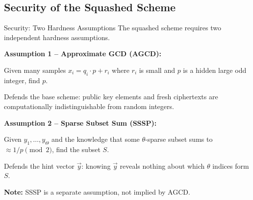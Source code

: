 \documentclass[10pt]{beamer}
\begin{document}



\subsection{Security of the Squashed Scheme}

\begin{frame}{Security: Two Hardness Assumptions}
    The squashed scheme requires two independent hardness assumptions.
    \pause

    \vspace{0.3cm}
    \textbf{Assumption 1  --  Approximate GCD (AGCD):}

    Given many samples $x_i = q_i \cdot p + r_i$ where $r_i$ is small
    and $p$ is a hidden large odd integer, find $p$.

    \vspace{0.1cm}
    Defends the base scheme: public key elements and fresh ciphertexts
    are computationally indistinguishable from random integers.
    \pause

    \vspace{0.3cm}
    \textbf{Assumption 2  --  Sparse Subset Sum (SSSP):}

    Given $y_1, \ldots, y_\Theta$ and the knowledge that some
    $\theta$-sparse subset sums to $\approx 1/p \pmod{2}$,
    find the subset $S$.

    \vspace{0.1cm}
    Defends the hint vector $\vec{y}$: knowing $\vec{y}$ reveals nothing
    about which $\theta$ indices form $S$.
    \pause

    \vspace{0.3cm}
    \textbf{Note:} SSSP is a separate assumption, not implied by AGCD.
\end{frame}
\end{document}

